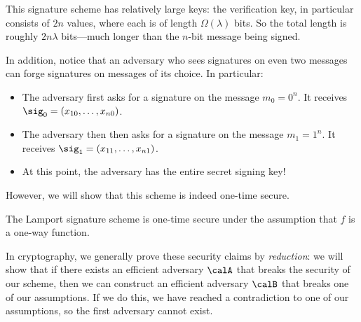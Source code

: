 This signature scheme has relatively large keys:
the verification key, in particular consists of $2n$ values,
where each is of length $\Omega(\lambda)$ bits.
So the total length is roughly $2n\lambda$ bits---much
longer than the $n$-bit message being signed.

In addition, notice that an adversary who sees signatures
on even two messages can forge signatures on messages of its choice.
In particular:
\begin{itemize}[noitemsep]
  \item The adversary first asks for a signature on the message $m_0 = 0^n$.
It receives $\sig_0 = (x_{10}, \ldots, x_{n0})$.
  \item The adversary then then asks for a signature on the message $m_1 = 1^n$.
    It receives $\sig_1 = (x_{11}, \ldots, x_{n1})$.
  \item At this point, the adversary has the entire secret signing key! 
\end{itemize}
However, we will show that this scheme is indeed one-time secure.

\begin{claim} 
The Lamport signature scheme is one-time secure under the
assumption that $f$ is a one-way function.
\end{claim}

In cryptography, we generally prove these security
claims by \emph{reduction}: we will show that
if there exists an efficient adversary $\calA$
that breaks the security of our scheme,
then we can construct an efficient adversary $\calB$ 
that breaks one of our assumptions.
If we do this, we have reached a contradiction to one
of our assumptions, so the first adversary cannot exist.

